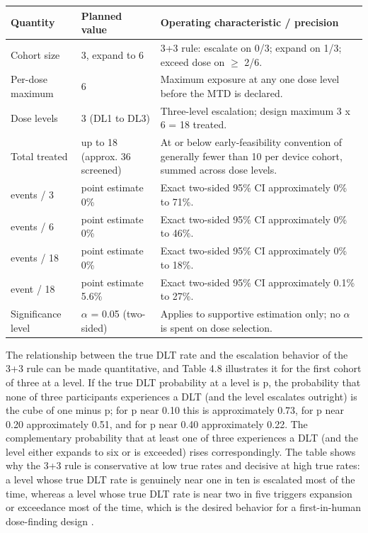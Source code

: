 \vspace{0.3cm}

\noindent\begin{tabularx}{\textwidth}{L{2.9cm} L{3.7cm} Y}
\toprule
\textbf{Quantity} & \textbf{Planned value} & \textbf{Operating characteristic / precision} \\
\midrule
Cohort size & 3, expand to 6 & 3+3 rule: escalate on 0/3; expand on 1/3; exceed dose on $\geq$ 2/6. \\
\addlinespace
Per-dose maximum & 6 & Maximum exposure at any one dose level before the MTD is declared. \\
\addlinespace
Dose levels & 3 (DL1 to DL3) & Three-level escalation; design maximum 3 x 6 = 18 treated. \\
\addlinespace
Total treated & up to 18 (approx. 36 screened) & At or below early-feasibility convention of generally fewer than 10 per device cohort, summed across dose levels. \\
 events / 3 & point estimate 0\% & Exact two-sided 95\% CI approximately 0\% to 71\%. \\
 events / 6 & point estimate 0\% & Exact two-sided 95\% CI approximately 0\% to 46\%. \\
 events / 18 & point estimate 0\% & Exact two-sided 95\% CI approximately 0\% to 18\%. \\
 event / 18 & point estimate 5.6\% & Exact two-sided 95\% CI approximately 0.1\% to 27\%. \\
\addlinespace
Significance level & $\alpha$ = 0.05 (two-sided) & Applies to supportive estimation only; no $\alpha$ is spent on dose selection. \\
\bottomrule
\end{tabularx}
\vspace*{-0.3cm}

The relationship between the true DLT rate and the escalation behavior of the 3+3
rule can be made quantitative, and Table 4.8 illustrates it for the first cohort of
three at a level. If the true DLT probability at a level is p, the probability that
none of three participants experiences a DLT (and the level escalates outright) is
the cube of one minus p; for p near 0.10 this is approximately 0.73, for p near 0.20
approximately 0.51, and for p near 0.40 approximately 0.22. The complementary
probability that at least one of three experiences a DLT (and the level either
expands to six or is exceeded) rises correspondingly. The table shows why the 3+3
rule is conservative at low true rates and decisive at high true rates: a level whose
true DLT rate is genuinely near one in ten is escalated most of the time, whereas a
level whose true DLT rate is near two in five triggers expansion or exceedance most
of the time, which is the desired behavior for a first-in-human dose-finding design
\cite{phase1guidance,ichpaistduni}.

